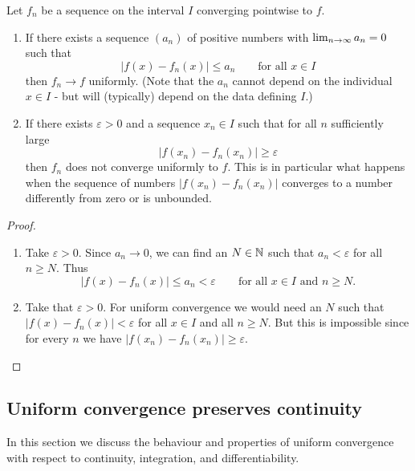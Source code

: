 \documentclass[10pt, a4paper]{article}
\begin{document}
\begin{lemma}
    Let $f_n$ be a sequence on the interval $I$ converging pointwise to $f$.
    \begin{enumerate}[label = (\roman*)]
        \item If there exists a sequence $(a_n)$ of positive numbers with $\lim_{n \rightarrow \infty} a_n = 0$ such that
        \[
        |f(x) - f_n(x)| \leq a_n\qquad\text{for all } x \in I
        \]
        then $f_n \rightarrow f$ uniformly.
        (Note that the $a_n$ cannot depend on the individual $x \in I$ - but will
        (typically)
        depend on the data defining $I$.)

        \item If there exists $\varepsilon > 0$ and a sequence $x_n \in I$ such that for all $n$ sufficiently large
        \[
        |f(x_n) - f_n(x_n)| \geq \varepsilon
        \]
        then $f_n$ does not converge uniformly to $f$.
        This is in particular what happens when the sequence of numbers $|f(x_n) - f_n(x_n)|$ converges to a number differently from zero or is unbounded.
    \end{enumerate}
    \begin{proof}
        \begin{enumerate}[label = (\roman*)]
            \item Take $\varepsilon > 0$.
            Since $a_n \rightarrow 0$,
            we can find an $N \in \mathbb{N}$ such that $a_n < \varepsilon$ for all $n \geq N$.
            Thus
            \[
            |f(x) - f_n(x)| \leq a_n < \varepsilon\qquad\text{for all } x \in I\text{ and } n \geq N.
            \]

            \item Take that $\varepsilon > 0$.
            For uniform convergence we would need an $N$ such that $|f(x) - f_n(x)| < \varepsilon$ for all $x \in I$ and all $n \geq N$.
            But this is impossible since for every $n$ we have $|f(x_n) - f_n(x_n)| \geq \varepsilon$.
        \end{enumerate}
    \end{proof}
\end{lemma}

\subsection{Uniform convergence preserves continuity}

In this section we discuss the behaviour and properties of uniform convergence with respect to continuity,
integration,
and differentiability.
\end{document}
